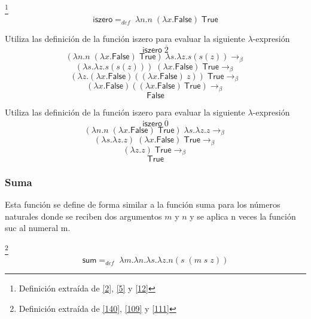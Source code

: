 	\begin{definition}\footnote{Definición extraída de \hyperlink{2}{[2]},  \hyperlink{5}{[5]} y \hyperlink{12}{[12]}}
            $$\textsf{iszero} =_{def}  \; \lambda n. n\;(\lambda x.\textsf{False}) \;\textsf{True}$$
        \end{definition}
        \begin{exercise}
            Utiliza las definición de la función \textsf{iszero} para evaluar la siguiente $\lambda$-expresión
            \[
                \textsf{iszero}  \; \overline{2}
            \]
            \[
                (\lambda n. n\;(\lambda x.\textsf{False})\;\textsf{True}) \; \lambda s.\lambda z.s(s(z)) \rightarrow_\beta 
            \]
		\[
			(\lambda s.\lambda z.s(s(z))) \; (\lambda x.\textsf{False}) \; \textsf{True}  \rightarrow_\beta 
		\]
		\[
			(\lambda z.(\lambda x.\textsf{False})((\lambda x.\textsf{False})\:z))\; \textsf{True}  \rightarrow_\beta 
		\]
		\[
			(\lambda x.\textsf{False}) ((\lambda x.\textsf{False})\:\textsf{True})  \rightarrow_\beta 
		\]
		\[
			 \textsf{False}
		\]
            

        \end{exercise}

        \begin{exercise}
            Utiliza las definición de la función \textsf{iszero} para evaluar la siguiente $\lambda$-expresión
            \[
                \textsf{iszero} \; \overline{0}
            \]
            \[
                (\lambda n. n \; (\lambda x.\textsf{False}) \; \textsf{True}) \; \lambda s.\lambda z.z \rightarrow_\beta 
            \]
		\[
			(\lambda s. \lambda z.z) \; (\lambda x.\textsf{False}) \; \textsf{True} \rightarrow_\beta 
		\]
		\[
			(\lambda z.z) \; \textsf{True} \rightarrow_\beta 
		\]
		\[
			\textsf{True}
		\]
        \end{exercise}
        
    \subsubsection{Suma}
        Esta función se define de forma similar a la función suma para los números naturales  donde se reciben dos argumentos $m$ y $n$ y se aplica n veces la función \textsf{suc} al numeral m.

        \begin{definition}\footnote{Definición extraída de \hyperlink{140}{[140]}, \hyperlink{109}{[109]} y  \hyperlink{111}{[111]}}
            $$\textsf{sum} =_{def}  \; \lambda m.\lambda n.\lambda s.\lambda z.n(s \; (m \; s \; z))$$
        \end{definition}


